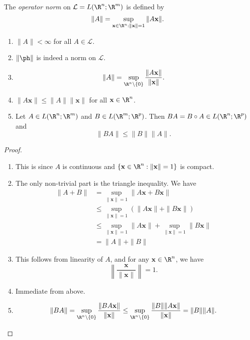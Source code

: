 \documentclass[a4paper]{article}
\begin{document}
\begin{defi}
  The \emph{operator norm} on $\mathcal{L} = L(\R^n; \R^m)$ is defined by
  \[
    \|A\| = \sup_{\mathbf{x} \in \R^n: \|\mathbf{x}\| = 1} \|A \mathbf{x}\|.
  \]
\end{defi}

\begin{prop}\leavevmode
  \begin{enumerate}
    \item $\|A\| < \infty$ for all $A \in \mathcal{L}$.
    \item $\|\ph\|$ is indeed a norm on $\mathcal{L}$.
    \item
      \[
        \|A\| = \sup_{ \R^n\setminus \{0\}} \frac{\|A \mathbf{x}\|}{\|\mathbf{x}\|}.
      \]
    \item $\|A \mathbf{x}\| \leq \|A\| \|\mathbf{x}\|$ for all $\mathbf{x} \in \R^n$.
    \item Let $A \in L(\R^n; \R^m)$ and $B \in L(\R^m; \R^p)$. Then $BA = B\circ A \in L(\R^n; \R^p)$ and
      \[
        \|B A\| \leq \|B\| \|A\|.
      \]
  \end{enumerate}
\end{prop}

\begin{proof}\leavevmode
  \begin{enumerate}
    \item This is since $A$ is continuous and $\{\mathbf{x} \in \R^n: \|\mathbf{x}\| = 1\}$ is compact.
    \item The only non-trivial part is the triangle inequality. We have
      \begin{align*}
        \|A + B\| &= \sup_{\|\mathbf{x}\| = 1} \|A \mathbf{x} + B \mathbf{x}\| \\
        &\leq \sup_{\|\mathbf{x}\| = 1} (\|A \mathbf{x}\| + \|B \mathbf{x}\|)\\
        &\leq \sup_{\|\mathbf{x}\| = 1} \|A \mathbf{x}\| + \sup_{\|\mathbf{x}\| = 1} \|B \mathbf{x}\|\\
        &= \|A\| + \|B\|
      \end{align*}
    \item This follows from linearity of $A$, and for any $\mathbf{x} \in \R^n$, we have
      \[
        \left\|\frac{\mathbf{x}}{\|\mathbf{x}\|}\right\| = 1.
      \]
    \item Immediate from above.
    \item
      \[
        \|BA\| = \sup_{\R^n\setminus \{0\}} \frac{\|BA \mathbf{x}\|}{\|\mathbf{x}\|} \leq \sup_{\R^n \setminus \{0\}} \frac{\|B\| \|A \mathbf{x}\|}{\|\mathbf{x}\|} = \|B\|\|A\|.
      \]
  \end{enumerate}
\end{proof}
\end{document}
